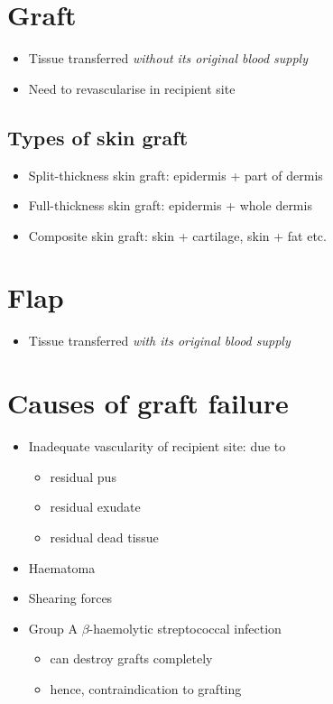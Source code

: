 \documentclass[
  14pt,
]{memoir}
\providecommand{\tightlist}{%
  \setlength{\itemsep}{0pt}\setlength{\parskip}{0pt}}
\begin{document}
\hypertarget{graft}{%
\section{Graft}\label{graft}}

\begin{itemize}
\tightlist
\item
  Tissue transferred \emph{without its original blood supply}
\item
  Need to revascularise in recipient site
\end{itemize}

\hypertarget{types-of-skin-graft}{%
\subsection{Types of skin graft}\label{types-of-skin-graft}}

\begin{itemize}
\tightlist
\item
  Split-thickness skin graft: epidermis + part of dermis
\item
  Full-thickness skin graft: epidermis + whole dermis
\item
  Composite skin graft: skin + cartilage, skin + fat etc.
\end{itemize}

\hypertarget{flap}{%
\section{Flap}\label{flap}}

\begin{itemize}
\tightlist
\item
  Tissue transferred \emph{with its original blood supply}
\end{itemize}

\hypertarget{causes-of-graft-failure}{%
\section{Causes of graft failure}\label{causes-of-graft-failure}}

\begin{itemize}
\tightlist
\item
  Inadequate vascularity of recipient site: due to

  \begin{itemize}
  \tightlist
  \item
    residual pus
  \item
    residual exudate
  \item
    residual dead tissue
  \end{itemize}
\item
  Haematoma
\item
  Shearing forces
\item
  Group A \(\beta\)-haemolytic streptococcal infection

  \begin{itemize}
  \tightlist
  \item
    can destroy grafts completely
  \item
    hence, contraindication to grafting
  \end{itemize}
\end{itemize}
\end{document}
